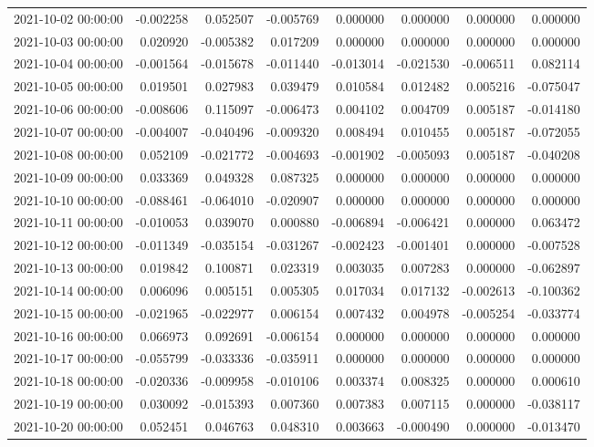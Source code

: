 \begin{tabular}{lrrrrrrr}
2021-10-02 00:00:00 & -0.002258 & 0.052507 & -0.005769 & 0.000000 & 0.000000 & 0.000000 & 0.000000 \\
2021-10-03 00:00:00 & 0.020920 & -0.005382 & 0.017209 & 0.000000 & 0.000000 & 0.000000 & 0.000000 \\
2021-10-04 00:00:00 & -0.001564 & -0.015678 & -0.011440 & -0.013014 & -0.021530 & -0.006511 & 0.082114 \\
2021-10-05 00:00:00 & 0.019501 & 0.027983 & 0.039479 & 0.010584 & 0.012482 & 0.005216 & -0.075047 \\
2021-10-06 00:00:00 & -0.008606 & 0.115097 & -0.006473 & 0.004102 & 0.004709 & 0.005187 & -0.014180 \\
2021-10-07 00:00:00 & -0.004007 & -0.040496 & -0.009320 & 0.008494 & 0.010455 & 0.005187 & -0.072055 \\
2021-10-08 00:00:00 & 0.052109 & -0.021772 & -0.004693 & -0.001902 & -0.005093 & 0.005187 & -0.040208 \\
2021-10-09 00:00:00 & 0.033369 & 0.049328 & 0.087325 & 0.000000 & 0.000000 & 0.000000 & 0.000000 \\
2021-10-10 00:00:00 & -0.088461 & -0.064010 & -0.020907 & 0.000000 & 0.000000 & 0.000000 & 0.000000 \\
2021-10-11 00:00:00 & -0.010053 & 0.039070 & 0.000880 & -0.006894 & -0.006421 & 0.000000 & 0.063472 \\
2021-10-12 00:00:00 & -0.011349 & -0.035154 & -0.031267 & -0.002423 & -0.001401 & 0.000000 & -0.007528 \\
2021-10-13 00:00:00 & 0.019842 & 0.100871 & 0.023319 & 0.003035 & 0.007283 & 0.000000 & -0.062897 \\
2021-10-14 00:00:00 & 0.006096 & 0.005151 & 0.005305 & 0.017034 & 0.017132 & -0.002613 & -0.100362 \\
2021-10-15 00:00:00 & -0.021965 & -0.022977 & 0.006154 & 0.007432 & 0.004978 & -0.005254 & -0.033774 \\
2021-10-16 00:00:00 & 0.066973 & 0.092691 & -0.006154 & 0.000000 & 0.000000 & 0.000000 & 0.000000 \\
2021-10-17 00:00:00 & -0.055799 & -0.033336 & -0.035911 & 0.000000 & 0.000000 & 0.000000 & 0.000000 \\
2021-10-18 00:00:00 & -0.020336 & -0.009958 & -0.010106 & 0.003374 & 0.008325 & 0.000000 & 0.000610 \\
2021-10-19 00:00:00 & 0.030092 & -0.015393 & 0.007360 & 0.007383 & 0.007115 & 0.000000 & -0.038117 \\
2021-10-20 00:00:00 & 0.052451 & 0.046763 & 0.048310 & 0.003663 & -0.000490 & 0.000000 & -0.013470 \\

\end{tabular}
